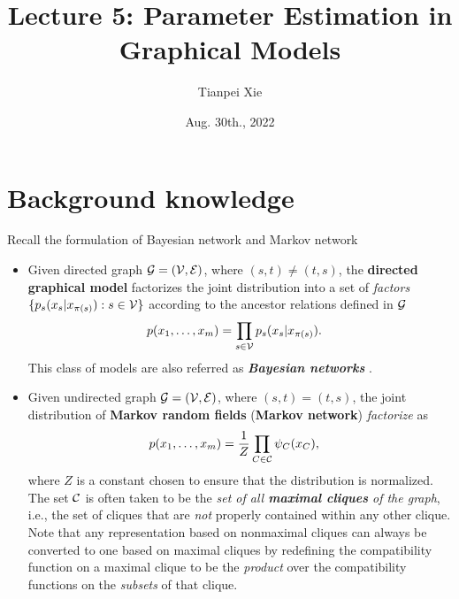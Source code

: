 \documentclass[11pt]{article}
\begin{document}
\title{Lecture 5: Parameter Estimation in Graphical Models}
\author{ Tianpei Xie}
\date{Aug. 30th., 2022 }
\maketitle
\tableofcontents
\newpage
\allowdisplaybreaks
\section{Background knowledge}
Recall the formulation of Bayesian network and Markov network
\begin{itemize}
\item Given directed graph ${\mathcal G}=({\mathcal V}, {\mathcal E})$, where $(s,t) \neq (t,s)$, the \textbf{directed graphical model}  factorizes the joint distribution into a set of \emph{factors} $\{p_s(x_s | x_{\pi(s)}): s\in {\mathcal V}\}$ according to the ancestor relations defined in ${\mathcal G}$
\begin{align}
p(x_1, \ldots, x_{m}) &= \prod_{s \in {\mathcal V}}p_s(x_s | x_{\pi(s)}). \label{eqn: dag_graph_factorization}
\end{align} This class of models are also referred as \emph{\textbf{Bayesian networks}} \citep{koller2009probabilistic}.


\item Given undirected graph ${\mathcal G}=({\mathcal V}, {\mathcal E})$, where $(s,t) = (t,s)$, the joint distribution of \textbf{Markov random fields} (\textbf{Markov network}) \emph{factorize} as
\begin{align}
p(x_1, \ldots, x_{m}) &= \frac{1}{Z}\prod_{C \in {\mathcal C}}\psi_{C}(x_{C}),\label{eqn: mrf_graph_factorization}
\end{align} where $Z$ is a constant chosen to ensure that the distribution is normalized. The set ${\mathcal C}$ is often taken to be the \emph{set of all \textbf{maximal cliques} of the graph}, i.e., the set of cliques that are \emph{not} properly contained within any other clique. Note that any representation based on nonmaximal cliques can always be converted to one based on maximal cliques by redefining the compatibility function on a maximal clique to be the \emph{product} over the compatibility functions on the \emph{subsets} of that clique.


\end{itemize}
\end{document}
